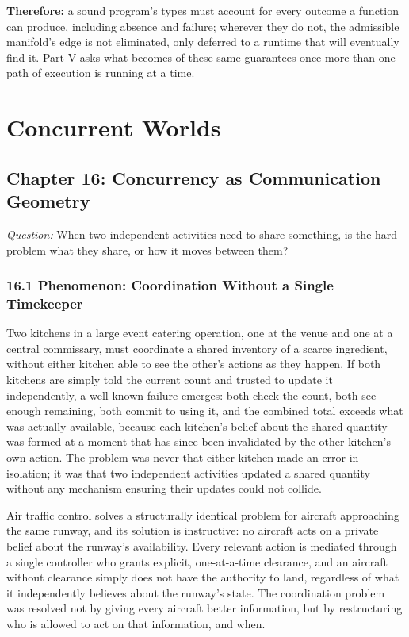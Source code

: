 \documentclass[11pt]{book}
\begin{document}
\noindent\textbf{Therefore:} a sound program's types must account for every outcome a function can produce, including absence and failure; wherever they do not, the admissible manifold's edge is not eliminated, only deferred to a runtime that will eventually find it. Part V asks what becomes of these same guarantees once more than one path of execution is running at a time.



\clearpage

\part{Concurrent Worlds}


\clearpage

\chapter*{Chapter 16: Concurrency as Communication Geometry}

\begin{firstprinciples}
\textit{Question:} When two independent activities need to share something, is the hard problem what they share, or how it moves between them?
\end{firstprinciples}

\section*{16.1 Phenomenon: Coordination Without a Single Timekeeper}

Two kitchens in a large event catering operation, one at the venue and one at a central commissary, must coordinate a shared inventory of a scarce ingredient, without either kitchen able to see the other's actions as they happen. If both kitchens are simply told the current count and trusted to update it independently, a well-known failure emerges: both check the count, both see enough remaining, both commit to using it, and the combined total exceeds what was actually available, because each kitchen's belief about the shared quantity was formed at a moment that has since been invalidated by the other kitchen's own action. The problem was never that either kitchen made an error in isolation; it was that two independent activities updated a shared quantity without any mechanism ensuring their updates could not collide.

Air traffic control solves a structurally identical problem for aircraft approaching the same runway, and its solution is instructive: no aircraft acts on a private belief about the runway's availability. Every relevant action is mediated through a single controller who grants explicit, one-at-a-time clearance, and an aircraft without clearance simply does not have the authority to land, regardless of what it independently believes about the runway's state. The coordination problem was resolved not by giving every aircraft better information, but by restructuring who is allowed to act on that information, and when.
\end{document}
